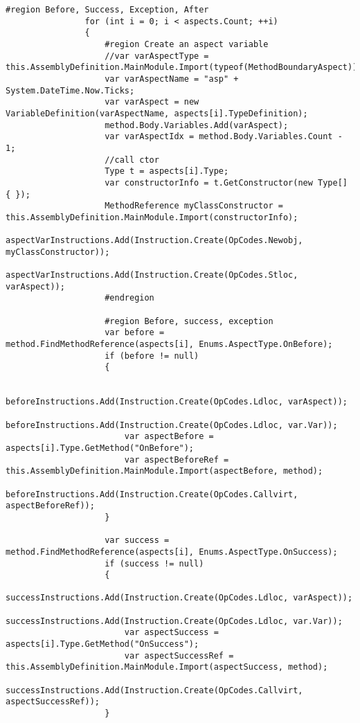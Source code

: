 \begin{lstlisting}[caption={../buffalo/Injectors/MethodBoundaryInjector.cs}, label=../buffalo/Injectors/MethodBoundaryInjector.cs, frame=tb, basicstyle=\scriptsize]
                #region Before, Success, Exception, After
                for (int i = 0; i < aspects.Count; ++i)
                {
                    #region Create an aspect variable
                    //var varAspectType = this.AssemblyDefinition.MainModule.Import(typeof(MethodBoundaryAspect));
                    var varAspectName = "asp" + System.DateTime.Now.Ticks;
                    var varAspect = new VariableDefinition(varAspectName, aspects[i].TypeDefinition);
                    method.Body.Variables.Add(varAspect);
                    var varAspectIdx = method.Body.Variables.Count - 1;
                    //call ctor
                    Type t = aspects[i].Type;
                    var constructorInfo = t.GetConstructor(new Type[] { });
                    MethodReference myClassConstructor = this.AssemblyDefinition.MainModule.Import(constructorInfo);
                    aspectVarInstructions.Add(Instruction.Create(OpCodes.Newobj, myClassConstructor));
                    aspectVarInstructions.Add(Instruction.Create(OpCodes.Stloc, varAspect));
                    #endregion

                    #region Before, success, exception
                    var before = method.FindMethodReference(aspects[i], Enums.AspectType.OnBefore);
                    if (before != null)
                    {

                        beforeInstructions.Add(Instruction.Create(OpCodes.Ldloc, varAspect));
                        beforeInstructions.Add(Instruction.Create(OpCodes.Ldloc, var.Var));
                        var aspectBefore = aspects[i].Type.GetMethod("OnBefore");
                        var aspectBeforeRef = this.AssemblyDefinition.MainModule.Import(aspectBefore, method);
                        beforeInstructions.Add(Instruction.Create(OpCodes.Callvirt, aspectBeforeRef));
                    }

                    var success = method.FindMethodReference(aspects[i], Enums.AspectType.OnSuccess);
                    if (success != null)
                    {
                        successInstructions.Add(Instruction.Create(OpCodes.Ldloc, varAspect));
                        successInstructions.Add(Instruction.Create(OpCodes.Ldloc, var.Var));
                        var aspectSuccess = aspects[i].Type.GetMethod("OnSuccess");
                        var aspectSuccessRef = this.AssemblyDefinition.MainModule.Import(aspectSuccess, method);
                        successInstructions.Add(Instruction.Create(OpCodes.Callvirt, aspectSuccessRef));
                    }


\end{lstlisting}
